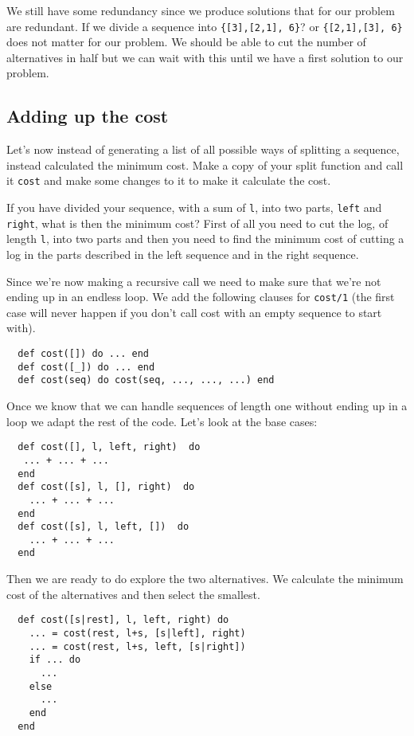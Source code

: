 \documentclass[a4paper,11pt]{article}
\begin{document}
We still have some redundancy since we produce solutions that for our
problem are redundant. If we divide a sequence into {\tt\{[3],[2,1],
  6\}}? or {\tt\{[2,1],[3], 6\}} does not matter for our problem. We
should be able to cut the number of alternatives in half but we can
wait with this until we have a first solution to our problem.


\subsection*{Adding up the cost}

Let's now instead of generating a list of all possible ways of
splitting a sequence, instead calculated the minimum cost. Make a copy
of your split function and call it {\tt cost} and make some changes to
it to make it calculate the cost.

If you have divided your sequence, with a sum of {\tt l}, into two
parts, {\tt left} and {\tt right}, what is then the minimum cost?
First of all you need to cut the log, of length {\tt l}, into two
parts and then you need to find the minimum cost of cutting a log in
the parts described in the left sequence and in the right sequence.

Since we're now making a recursive call we need to make sure that
we're not ending up in an endless loop. We add the following clauses
for {\tt cost/1} (the first case will never happen if you don't call
cost with an empty sequence to start with).

\begin{verbatim}
  def cost([]) do ... end  
  def cost([_]) do ... end  
  def cost(seq) do cost(seq, ..., ..., ...) end
\end{verbatim}

\noindent Once we know that we can handle sequences of length one without ending
up in a loop we adapt the rest of the code. Let's look at the base cases:

\begin{verbatim}
  def cost([], l, left, right)  do
   ... + ... + ...
  end
  def cost([s], l, [], right)  do
    ... + ... + ...
  end
  def cost([s], l, left, [])  do
    ... + ... + ...
  end
\end{verbatim}

\noindent Then we are ready to do explore the two alternatives. We
calculate the minimum cost of the alternatives and then select the smallest.

\begin{verbatim}
  def cost([s|rest], l, left, right) do
    ... = cost(rest, l+s, [s|left], right)
    ... = cost(rest, l+s, left, [s|right])
    if ... do
      ...
    else
      ...
    end
  end
 \end{verbatim}
\end{document}

